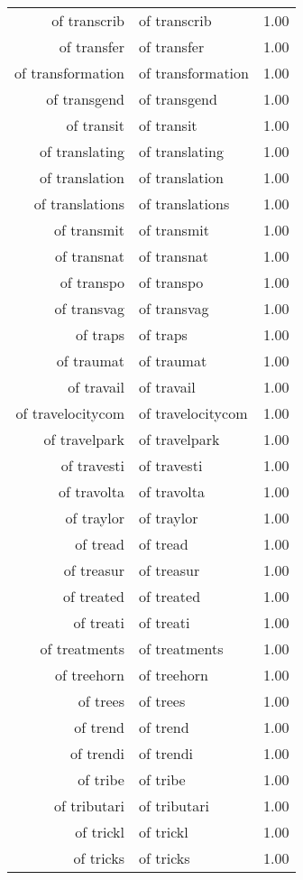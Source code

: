 \begin{table}[ht]
\begin{tabular}{rlr}
  of transcrib & of transcrib & 1.00 \\ 
  of transfer & of transfer & 1.00 \\ 
  of transformation & of transformation & 1.00 \\ 
  of transgend & of transgend & 1.00 \\ 
  of transit & of transit & 1.00 \\ 
  of translating & of translating & 1.00 \\ 
  of translation & of translation & 1.00 \\ 
  of translations & of translations & 1.00 \\ 
  of transmit & of transmit & 1.00 \\ 
  of transnat & of transnat & 1.00 \\ 
  of transpo & of transpo & 1.00 \\ 
  of transvag & of transvag & 1.00 \\ 
  of traps & of traps & 1.00 \\ 
  of traumat & of traumat & 1.00 \\ 
  of travail & of travail & 1.00 \\ 
  of travelocitycom & of travelocitycom & 1.00 \\ 
  of travelpark & of travelpark & 1.00 \\ 
  of travesti & of travesti & 1.00 \\ 
  of travolta & of travolta & 1.00 \\ 
  of traylor & of traylor & 1.00 \\ 
  of tread & of tread & 1.00 \\ 
  of treasur & of treasur & 1.00 \\ 
  of treated & of treated & 1.00 \\ 
  of treati & of treati & 1.00 \\ 
  of treatments & of treatments & 1.00 \\ 
  of treehorn & of treehorn & 1.00 \\ 
  of trees & of trees & 1.00 \\ 
  of trend & of trend & 1.00 \\ 
  of trendi & of trendi & 1.00 \\ 
  of tribe & of tribe & 1.00 \\ 
  of tributari & of tributari & 1.00 \\ 
  of trickl & of trickl & 1.00 \\ 
  of tricks & of tricks & 1.00 \\ 

\end{tabular}
\end{table}

